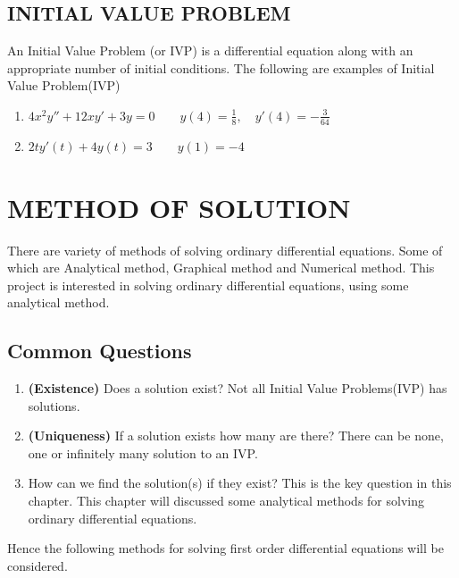 \documentclass[11pt]{report}
\newcommand{\bt}[1]{\textbf{#1}}
\newcommand{\dsp}{\displaystyle}
\newcommand{\NI}{\noindent}
\newcommand{\sprime}{'}
\newcommand{\dprime}{''}
\begin{document}
	
	\subsection{INITIAL VALUE PROBLEM}
	An Initial Value Problem (or IVP) is a differential equation along with an appropriate number of initial conditions. The following are examples of Initial Value Problem(IVP)
	\begin{enumerate}
		\item $\dsp 4x^2y\dprime + 12xy\sprime + 3y =0\qquad y(4)=\frac{1}{8},\quad y\sprime(4)=-\frac{3}{64}$
		\item $\dsp 2ty\sprime(t) + 4y(t) = 3\qquad y(1)=-4$
	\end{enumerate}


	\section{METHOD OF SOLUTION}
	There are variety of methods of solving ordinary differential equations. Some of which are Analytical method, Graphical method and Numerical method. This project is interested in solving ordinary differential equations, using some analytical method. 
	
	\subsection*{Common Questions}
	\begin{enumerate}
		\item \bt{(Existence)} Does a solution exist? Not all Initial Value Problems(IVP) has solutions.
		\item \bt{(Uniqueness)} If a solution exists how many are there? There can be none, one or infinitely many solution to an IVP.
		\item How can we find the solution(s) if they exist? This is the key question in this chapter. This chapter will discussed some analytical methods for solving ordinary differential equations.
	\end{enumerate}
	
	\NI Hence the following methods for solving first order differential equations will be considered. 
	
\end{document}
